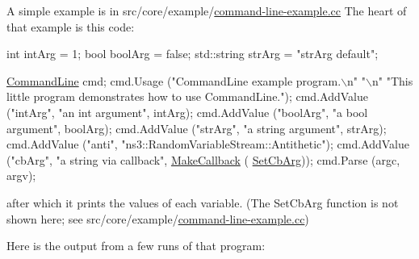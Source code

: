 A simple example is in {\ttfamily src/core/example/}{\ttfamily \hyperlink{command-line-example_8cc}{command-\/line-\/example.\+cc}} The heart of that example is this code\+:


\begin{DoxyCode}
\textcolor{keywordtype}{int}         intArg  = 1;
\textcolor{keywordtype}{bool}        boolArg = \textcolor{keyword}{false};
std::string strArg  = \textcolor{stringliteral}{"strArg default"};

\hyperlink{classns3_1_1CommandLine_ae72c68fdc19bb9a8b20d7a3e17c9c7b0}{CommandLine} cmd;
cmd.Usage (\textcolor{stringliteral}{"CommandLine example program.\(\backslash\)n"}
           \textcolor{stringliteral}{"\(\backslash\)n"}
           \textcolor{stringliteral}{"This little program demonstrates how to use CommandLine."});
cmd.AddValue (\textcolor{stringliteral}{"intArg"},  \textcolor{stringliteral}{"an int argument"},       intArg);
cmd.AddValue (\textcolor{stringliteral}{"boolArg"}, \textcolor{stringliteral}{"a bool argument"},       boolArg);
cmd.AddValue (\textcolor{stringliteral}{"strArg"},  \textcolor{stringliteral}{"a string argument"},     strArg);
cmd.AddValue (\textcolor{stringliteral}{"anti"},    \textcolor{stringliteral}{"ns3::RandomVariableStream::Antithetic"});
cmd.AddValue (\textcolor{stringliteral}{"cbArg"},   \textcolor{stringliteral}{"a string via callback"}, \hyperlink{group__makecallbackmemptr_ga9376283685aa99d204048d6a4b7610a4}{MakeCallback} (
      \hyperlink{command-line-example_8cc_adeee81f82b40e460fd3e5165bac7d91f}{SetCbArg}));
cmd.Parse (argc, argv);
\end{DoxyCode}
 after which it prints the values of each variable. (The {\ttfamily Set\+Cb\+Arg} function is not shown here; see {\ttfamily src/core/example/}{\ttfamily \hyperlink{command-line-example_8cc}{command-\/line-\/example.\+cc}})

Here is the output from a few runs of that program\+:

